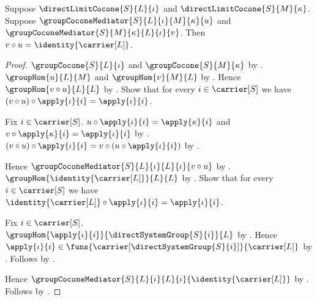 \begin{lemma}\label{direct_limit_mediator_composite_identity}
    Suppose $\directLimitCocone{S}{L}{\iota}$ and
        $\directLimitCocone{S}{M}{\kappa}$.
    Suppose $\groupCoconeMediator{S}{L}{\iota}{M}{\kappa}{u}$ and
        $\groupCoconeMediator{S}{M}{\kappa}{L}{\iota}{v}$.
    Then $v\circ u=\identity{\carrier[L]}$.
\end{lemma}
\begin{proof}
    $\groupCocone{S}{L}{\iota}$ and
        $\groupCocone{S}{M}{\kappa}$ by
        .
    $\groupHom{u}{L}{M}$ and $\groupHom{v}{M}{L}$ by
        .
    Hence $\groupHom{v\circ u}{L}{L}$ by
        .
    Show that for every $i\in\carrier[S]$ we have
        $(v\circ u)\circ\apply{\iota}{i}=\apply{\iota}{i}$.
    \begin{subproof}
        Fix $i\in\carrier[S]$.
        $u\circ\apply{\iota}{i}=\apply{\kappa}{i}$ and
            $v\circ\apply{\kappa}{i}=\apply{\iota}{i}$ by
            .
        $(v\circ u)\circ\apply{\iota}{i}
            =v\circ(u\circ\apply{\iota}{i})$ by
            .
    \end{subproof}
    Hence $\groupCoconeMediator
        {S}{L}{\iota}{L}{\iota}{v\circ u}$ by
        .
    $\groupHom{\identity{\carrier[L]}}{L}{L}$ by
        .
    Show that for every $i\in\carrier[S]$ we have
        $\identity{\carrier[L]}\circ\apply{\iota}{i}
            =\apply{\iota}{i}$.
    \begin{subproof}
        Fix $i\in\carrier[S]$.
        $\groupHom{\apply{\iota}{i}}
            {\directSystemGroup{S}{i}}{L}$ by
            .
        Hence $\apply{\iota}{i}\in
            \funs{\carrier[\directSystemGroup{S}{i}]}{\carrier[L]}$ by
            .
        Follows by .
    \end{subproof}
    Hence $\groupCoconeMediator
        {S}{L}{\iota}{L}{\iota}{\identity{\carrier[L]}}$ by
        .
    Follows by .
\end{proof}


